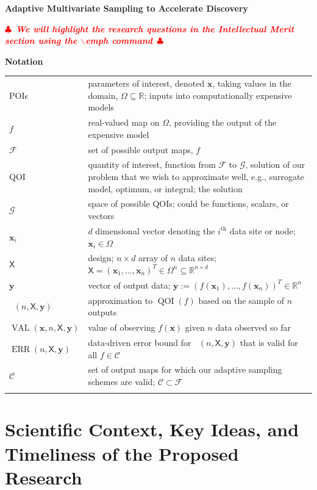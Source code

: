 \documentclass[11pt]{NSFamsart}
\DeclareMathOperator{\QOI}{QOI} %
\DeclareMathOperator{\APP}{\widehat{\QOI}}
\DeclareMathOperator{\ERR}{ERR}
\DeclareMathOperator{\VAL}{VAL}
\newcommand{\reals}{{\mathbb{R}}}
\newcommand{\mX}{\mathsf{X}}
\newcommand{\bx}{{\boldsymbol{x}}}
\newcommand{\by}{{\boldsymbol{y}}}
\newcommand{\calc}{{\mathcal{C}}}
\newcommand{\calf}{{\mathcal{F}}}
\newcommand{\calg}{{\mathcal{G}}}
\newif\ifnotesw \noteswtrue
\newcommand{\notes}[1]{\ifnotesw \textcolor{red}{  $\clubsuit$\ {\sf \bf \it  #1}\ $\clubsuit$  }\fi}
\begin{document}

\begin{center}
\Large \textbf{
Adaptive Multivariate Sampling to Accelerate  Discovery\\ 
}
\end{center}
\vspace{-2ex}

\setcounter{tocdepth}{3}
\tableofcontents

\vspace{-6ex}


\notes{We will highlight the research questions in the Intellectual Merit section using the $\backslash$emph command}

\noindent \textbf{Notation}

\begin{longtable}{>{\raggedleft}p{2.5cm}@{\quad}>{\raggedright}p{12.5cm}}
POIs & parameters of interest, denoted $\bx$, taking values in the domain, $\Omega \subseteq \reals$; inputs into computationally expensive models \tabularnewline
$f$ & real-valued map on $\Omega$, providing the output of the expensive model \tabularnewline
$\calf$ & set of possible output maps, $f$ \tabularnewline
QOI & quantity of interest, function from $\calf$ to $\calg$, solution of our problem that we wish to approximate well, e.g., surrogate model, optimum, or integral; the solution \tabularnewline
$\calg$ & space of possible QOIs; could be functions, scalars, or vectors\tabularnewline
$\bx_i$ & $d$ dimensional vector denoting the $i^{\text{th}}$ data site or node; $\bx_i \in \Omega$ \tabularnewline
$\mX$ & design;  $n \times d$ array of $n$ data sites; $\mX = (\bx_1, \ldots, \bx_n)^T \in \Omega^{n} \subseteq \reals^{n \times d}$ \tabularnewline
$\by$ & vector of output data; $\by := (f(\bx_1), \ldots, f(\bx_n))^T \in \reals^n$   \tabularnewline
$\APP(n,\mX,\by)$ & approximation to $\QOI(f)$ based on the sample of $n$ outputs\tabularnewline
$\VAL(\bx,n,\mX, \by)$ & value of observing $f(\bx)$ given $n$ data observed so far \tabularnewline
$\ERR(n,\mX,\by)$ & data-driven error bound for $\APP(n,\mX,\by)$ that is valid for all $f \in \calc$ \tabularnewline
$\calc$ & set of output maps for which our adaptive sampling schemes are valid; $\calc \subset \calf$ \tabularnewline
& \tabularnewline
\end{longtable}
\newpage



\section{Scientific Context, Key Ideas, and Timeliness of the Proposed Research}
\end{document}
